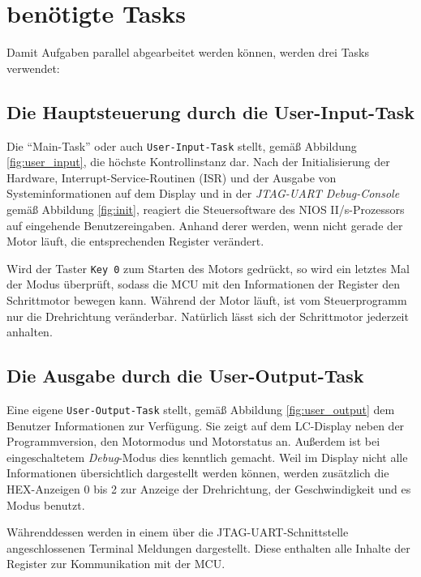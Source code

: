 \documentclass[ngerman,fontsize=12pt , paper=a4 , twoside=false , DIV12 , BCOR=1cm ,
numbers=enddot , listof=totoc , bibliography=totoc , index=totoc ,
headings=small , headlines=1.5 , final]{scrbook}
\begin{document}
\section{benötigte Tasks}\label{benuxf6tigte-tasks}

Damit Aufgaben parallel abgearbeitet werden können, werden drei Tasks
verwendet:

\subsection{Die Hauptsteuerung durch die
User-Input-Task}\label{die-hauptsteuerung-durch-die-user-input-task}

Die \enquote{Main-Task} oder auch \lstinline!User-Input-Task! stellt,
gemäß Abbildung \ref{fig:user_input}, die höchste Kontrollinstanz dar.
Nach der Initialisierung der Hardware, Interrupt-Service-Routinen (ISR)
und der Ausgabe von Systeminformationen auf dem Display und in der
\emph{JTAG-UART Debug-Console} gemäß Abbildung \ref{fig:init}, reagiert
die Steuersoftware des NIOS II/s-Prozessors auf eingehende
Benutzereingaben. Anhand derer werden, wenn nicht gerade der Motor
läuft, die entsprechenden Register verändert.

Wird der Taster \lstinline!Key 0! zum Starten des Motors gedrückt, so
wird ein letztes Mal der Modus überprüft, sodass die MCU mit den
Informationen der Register den Schrittmotor bewegen kann. Während der
Motor läuft, ist vom Steuerprogramm nur die Drehrichtung veränderbar.
Natürlich lässt sich der Schrittmotor jederzeit anhalten.

\subsection{Die Ausgabe durch die
User-Output-Task}\label{die-ausgabe-durch-die-user-output-task}

Eine eigene \lstinline!User-Output-Task! stellt, gemäß Abbildung
\ref{fig:user_output} dem Benutzer Informationen zur Verfügung. Sie
zeigt auf dem LC-Display neben der Programmversion, den Motormodus und
Motorstatus an. Außerdem ist bei eingeschaltetem \emph{Debug}-Modus dies
kenntlich gemacht. Weil im Display nicht alle Informationen
übersichtlich dargestellt werden können, werden zusätzlich die
HEX-Anzeigen 0 bis 2 zur Anzeige der Drehrichtung, der Geschwindigkeit
und es Modus benutzt.

Währenddessen werden in einem über die JTAG-UART-Schnittstelle
angeschlossenen Terminal Meldungen dargestellt. Diese enthalten alle
Inhalte der Register zur Kommunikation mit der MCU.
\end{document}
